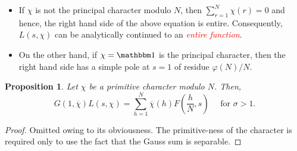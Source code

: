\documentclass[12pt]{article}
\theoremstyle{thmstyle}
\newtheorem{proposition}[theorem]{Proposition}
\theoremstyle{defstyle}
\newcommand{\caution}[1]{\textcolor{red}{\textit{#1}}}
\begin{document}
\begin{itemize}
    \item If $\chi$ is not the principal character modulo $N$, then $\sum_{r = 1}^N \chi(r) = 0$ and hence, the right hand side of the above equation is entire. Consequently, $L(s,\chi)$ can be analytically continued to an \caution{entire function}. 

    \item On the other hand, if $\chi = \mathbbm 1$ is the principal character, then the right hand side has a simple pole at $s = 1$ of residue $\varphi(N)/N$.
\end{itemize}

\begin{proposition}
    Let $\chi$ be a primitive character modulo $N$. Then,
    \begin{equation*}
        G(1, \overline\chi) L(s,\chi) = \sum_{h = 1}^N \overline\chi(h) F\left(\frac{h}{N}, s\right)\quad\text{ for }\sigma > 1.
    \end{equation*}
\end{proposition}
\begin{proof}
    Omitted owing to its obviousness. The primitive-ness of the character is required only to use the fact that the Gauss sum is separable.
\end{proof}
\end{document}
